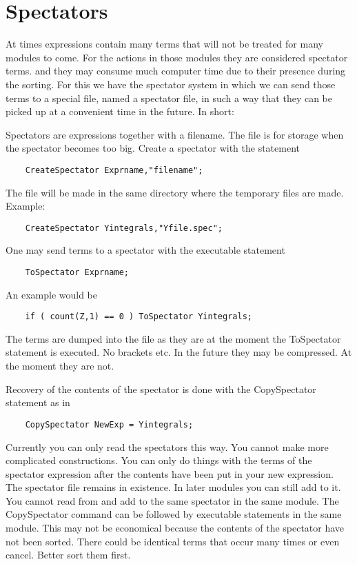 
\chapter{Spectators}
\label{spectators}

At times expressions contain many terms that will not be treated for many 
modules to come. For the actions in those modules they are considered 
spectator terms. and they may consume much computer time due to their 
presence during the sorting. For this we have the spectator system in which 
we can send those terms to a special file, named a spectator file, in such 
a way that they can be picked up at a convenient time in the future. In 
short:

\noindent
Spectators are expressions together with a filename. The 
file is for storage when the spectator becomes too big. Create a spectator 
with the statement
\begin{verbatim}
    CreateSpectator Exprname,"filename";
\end{verbatim}
The file will be made in the same directory where the temporary files are made. 
Example:
\begin{verbatim}
    CreateSpectator Yintegrals,"Yfile.spec";
\end{verbatim}
One may send terms to a spectator with the executable 
statement
\begin{verbatim}
    ToSpectator Exprname;
\end{verbatim}
An example would be
\begin{verbatim}
    if ( count(Z,1) == 0 ) ToSpectator Yintegrals;
\end{verbatim}
The terms are dumped into the file as they are at the moment the 
ToSpectator statement is executed. No brackets etc.
In the future they may be compressed. At the moment they are not.

Recovery of the contents of the spectator is done with the CopySpectator
statement as in
\begin{verbatim}
    CopySpectator NewExp = Yintegrals;
\end{verbatim}
Currently you can only read the spectators this way. You cannot make more 
complicated constructions. You can only do things with the terms of the 
spectator expression after the contents have been put in your new 
expression. The spectator file remains in existence. In later modules you 
can still add to it. You cannot read from and add to the same spectator in 
the same module. The CopySpectator command can be followed by executable 
statements in the same module. This may not be economical because the 
contents of the spectator have not been sorted. There could be identical 
terms that occur many times or even cancel. Better sort them first.

